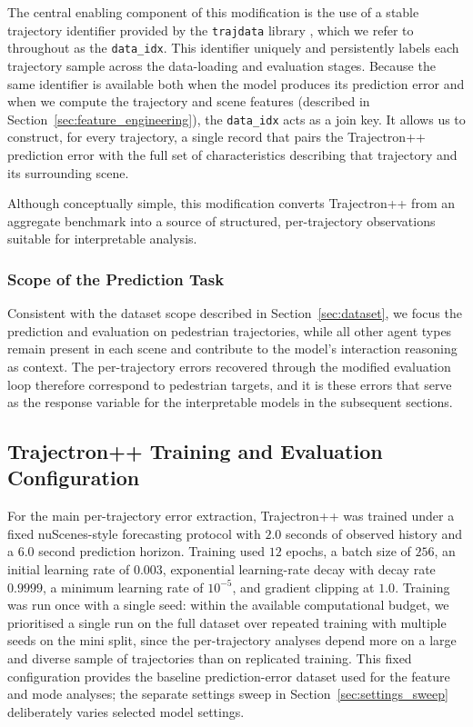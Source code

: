 \documentclass[12pt]{article}
\begin{document}
The central enabling component of this modification is the use of a stable trajectory identifier provided by the \texttt{trajdata} library \citep{ivanovic2023trajdata}, which we refer to throughout as the \texttt{data\_idx}. This identifier uniquely and persistently labels each trajectory sample across the data-loading and evaluation stages. Because the same identifier is available both when the model produces its prediction error and when we compute the trajectory and scene features (described in Section~\ref{sec:feature_engineering}), the \texttt{data\_idx} acts as a join key. It allows us to construct, for every trajectory, a single record that pairs the Trajectron++ prediction error with the full set of characteristics describing that trajectory and its surrounding scene.

Although conceptually simple, this modification converts Trajectron++ from an aggregate benchmark into a source of structured, per-trajectory observations suitable for interpretable analysis.

\subsubsection{Scope of the Prediction Task}

Consistent with the dataset scope described in Section~\ref{sec:dataset}, we focus the prediction and evaluation on pedestrian trajectories, while all other agent types remain present in each scene and contribute to the model's interaction reasoning as context. The per-trajectory errors recovered through the modified evaluation loop therefore correspond to pedestrian targets, and it is these errors that serve as the response variable for the interpretable models in the subsequent sections.

\subsection{Trajectron++ Training and Evaluation Configuration}
\label{sec:trajectron_configuration}

For the main per-trajectory error extraction, Trajectron++ was trained under a fixed nuScenes-style forecasting protocol \citep{caesar2020nuscenes,salzmann2020trajectron+} with $2.0$ seconds of observed history and a $6.0$ second prediction horizon. Training used $12$ epochs, a batch size of $256$, an initial learning rate of $0.003$, exponential learning-rate decay with decay rate $0.9999$, a minimum learning rate of $10^{-5}$, and gradient clipping at $1.0$. Training was run once with a single seed: within the available computational budget, we prioritised a single run on the full dataset over repeated training with multiple seeds on the mini split, since the per-trajectory analyses depend more on a large and diverse sample of trajectories than on replicated training. This fixed configuration provides the baseline prediction-error dataset used for the feature and mode analyses; the separate settings sweep in Section~\ref{sec:settings_sweep} deliberately varies selected model settings.
\end{document}
